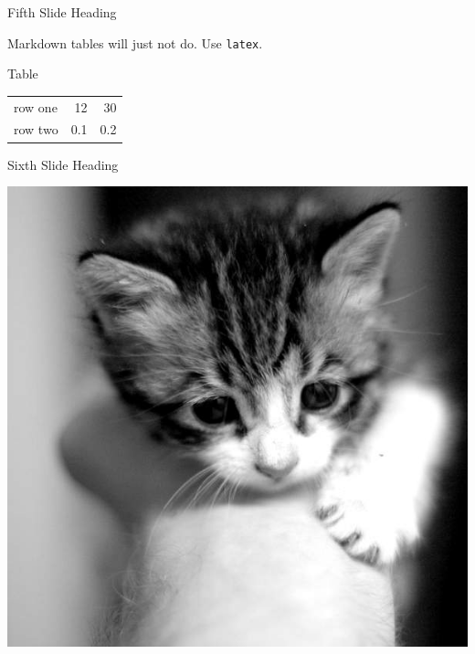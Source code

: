 \begin{frame}{Fifth Slide Heading}

\begin{block}{Markdown tables will just not do. Use \texttt{latex}.}

\begin{center}
Table \\
\vspace{1cm}
\begin{tabular}{lrr}
\hline
row one & 12 & 30 \\
row two & 0.1 & 0.2 \\ 
\hline
\end{tabular}
\end{center}

\end{block}

\end{frame}

\begin{frame}{Sixth Slide Heading}

\vspace{-0.4cm}

\begin{center}
\includegraphics[width=\textwidth,height=\textheight,keepaspectratio]{600.jpg}
\end{center}

\end{frame}
